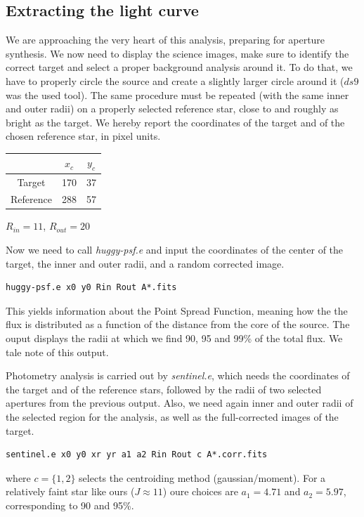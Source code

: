 \documentclass[a4paper,11pt,twocolumn]{article}
\begin{document}
\subsection{Extracting the light curve}
We are approaching the very heart of this analysis, preparing for 
aperture synthesis. We now need to display the science images, make 
sure to identify the correct target and select a proper background 
analysis around it. To do that, we have to properly circle the source 
and create a slightly larger circle around it ($ds9$ was the used tool).
The same procedure must be repeated (with the same inner and outer radii) 
on a properly selected reference star, close to and roughly as bright 
as the target. We hereby report the coordinates of the target and of the 
chosen reference star, in pixel units.
\begin{center}
    \begin{tabular}{|c|c|c|}
    \hline
     & $x_c$ & $y_c$ \\
    \hline
    Target    &  170  &  37    \\
    Reference & 288 & 57  \\
    \hline
    \end{tabular}

    \medskip

    $R_{in} = 11$, $R_{out} = 20$
\end{center}
Now we need to call \textit{huggy-psf.e} and input the coordinates of the 
center of the target, the inner and outer radii, and a random corrected 
image.
\begin{lstlisting}
huggy-psf.e x0 y0 Rin Rout A*.fits
\end{lstlisting}
This yields information about the Point Spread Function, meaning how the 
the flux is distributed as a function of the distance from the core of 
the source. The ouput displays the radii at which we find 90, 95 and 99\%
of the total flux. We tale note of this output. 

Photometry analysis is carried out by \textit{sentinel.e}, which needs 
the coordinates of the target and of the reference stars, followed by 
the radii of two selected apertures from the previous output. Also, we need 
again inner and outer radii of the selected region for the analysis, as well 
as the full-corrected images of the target. 
\begin{lstlisting}
sentinel.e x0 y0 xr yr a1 a2 Rin Rout c A*.corr.fits
\end{lstlisting}
where $c=\{1,2\}$ selects the centroiding method (gaussian/moment). For a 
relatively faint star like ours ($J\approx 11$) oure choices are $a_1=4.71$ and 
$a_2=5.97$, corresponding to 90 and 95\%. 
\end{document}
